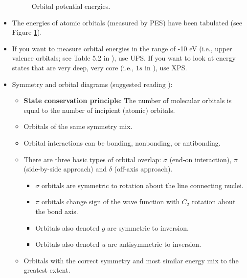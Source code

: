 \documentclass[../notes.tex]{subfiles}
\begin{document}
\begin{itemize}
\begin{figure}[h!]
        \caption{Orbital potential energies.}
        \label{fig:orbitalPotentialEnergies}
    \end{figure}
    \item The energies of atomic orbitals (measured by PES) have been tabulated (see Figure \ref{fig:orbitalPotentialEnergies}).
    \item If you want to measure orbital energies in the range of -10 eV (i.e., upper valence orbitals; see Table 5.2 in \textcite{bib:MiesslerFischerTarr}), use UPS. If you want to look at energy states that are very deep, very core (i.e., $1s$ in ), use XPS.
    \item Symmetry and orbital diagrams (suggested reading \textcite{bib:reinforceMOTheory}):
    \begin{itemize}
        \item \textbf{State conservation principle}: The number of molecular orbitals is equal to the number of incipient (atomic) orbitals.
        \item Orbitals of the same symmetry mix.
        \item Orbital interactions can be bonding, nonbonding, or antibonding.
        \item There are three basic types of orbital overlap: $\sigma$ (end-on interaction), $\pi$ (side-by-side approach) and $\delta$ (off-axis approach).
        \begin{itemize}
            \item $\sigma$ orbitals are symmetric to rotation about the line connecting nuclei.
            \item $\pi$ orbitals change sign of the wave function with $C_2$ rotation about the bond axis.
            \item Orbitals also denoted $g$ are symmetric to inversion.
            \item Orbitals also denoted $u$ are antisymmetric to inversion.
        \end{itemize}
        \item Orbitals with the correct symmetry and most similar energy mix to the greatest extent.

\end{itemize}
\end{itemize}
\end{document}
